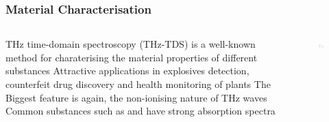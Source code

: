 \documentclass[10pt]{beamer}
\begin{document}
\begin{frame}
    \frametitle{Material Characterisation}

    \small
    \begin{columns}
        \begin{column}{.4\textwidth}
            \begin{outline}
                \1 THz time-domain spectroscopy (THz-TDS) is a well-known method for charaterising the material properties of different substances
                \2 Attractive applications in explosives detection, counterfeit drug discovery and health monitoring of plants
                \1 The Biggest feature is again, the non-ionising nature of THz waves
                \1 Common substances such as  and  have strong absorption spectra
             \end{outline}
        \end{column}
        \begin{column}{.6\textwidth}
            \scriptsize
            \begin{figure}[T!]
                \centering
                \includegraphics[width=.95\textwidth]{nitrogen.pdf}
                \label{fig:nitrogen}
            \end{figure}
        \end{column}
    \end{columns}
\end{frame}
\end{document}
